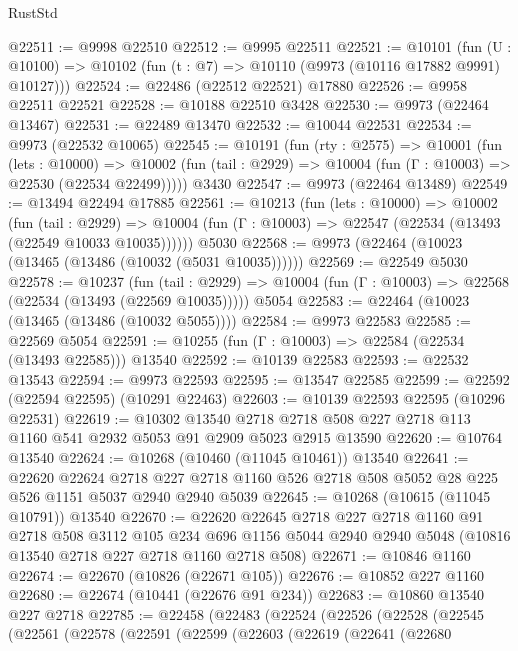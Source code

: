 \begin{lexlean}{RustStd}
\begin{coremodule}
@22511 := @9998 @22510
@22512 := @9995 @22511
@22521 := @10101
    (fun (U : @10100) => @10102 (fun (t : @7) => @10110 (@9973 (@10116 @17882 @9991) @10127)))
@22524 := @22486 (@22512 @22521) @17880
@22526 := @9958 @22511 @22521
@22528 := @10188 @22510 @3428
@22530 := @9973 (@22464 @13467)
@22531 := @22489 @13470
@22532 := @10044 @22531
@22534 := @9973 (@22532 @10065)
@22545 := @10191
    (fun (rty : @2575) =>
    @10001
      (fun (lets : @10000) =>
      @10002 (fun (tail : @2929) => @10004 (fun (Γ : @10003) => @22530 (@22534 @22499)))))
    @3430
@22547 := @9973 (@22464 @13489)
@22549 := @13494 @22494 @17885
@22561 := @10213
    (fun (lets : @10000) =>
    @10002
      (fun (tail : @2929) =>
      @10004 (fun (Γ : @10003) => @22547 (@22534 (@13493 (@22549 @10033 @10035))))))
    @5030
@22568 := @9973 (@22464 (@10023 (@13465 (@13486 (@10032 (@5031 @10035))))))
@22569 := @22549 @5030
@22578 := @10237
    (fun (tail : @2929) => @10004 (fun (Γ : @10003) => @22568 (@22534 (@13493 (@22569 @10035)))))
    @5054
@22583 := @22464 (@10023 (@13465 (@13486 (@10032 @5055))))
@22584 := @9973 @22583
@22585 := @22569 @5054
@22591 := @10255 (fun (Γ : @10003) => @22584 (@22534 (@13493 @22585))) @13540
@22592 := @10139 @22583
@22593 := @22532 @13543
@22594 := @9973 @22593
@22595 := @13547 @22585
@22599 := @22592 (@22594 @22595) (@10291 @22463)
@22603 := @10139 @22593 @22595 (@10296 @22531)
@22619 := @10302
    @13540
    @2718
    @2718
    @508
    @227
    @2718
    @113
    @1160
    @541
    @2932
    @5053
    @91
    @2909
    @5023
    @2915
    @13590
@22620 := @10764 @13540
@22624 := @10268 (@10460 (@11045 @10461)) @13540
@22641 := @22620
    @22624
    @2718
    @227
    @2718
    @1160
    @526
    @2718
    @508
    @5052
    @28
    @225
    @526
    @1151
    @5037
    @2940
    @2940
    @5039
@22645 := @10268 (@10615 (@11045 @10791)) @13540
@22670 := @22620
    @22645
    @2718
    @227
    @2718
    @1160
    @91
    @2718
    @508
    @3112
    @105
    @234
    @696
    @1156
    @5044
    @2940
    @2940
    @5048
    (@10816 @13540 @2718 @227 @2718 @1160 @2718 @508)
@22671 := @10846 @1160
@22674 := @22670 (@10826 (@22671 @105))
@22676 := @10852 @227 @1160
@22680 := @22674 (@10441 (@22676 @91 @234))
@22683 := @10860 @13540 @227 @2718
@22785 := @22458
    (@22483
      (@22524
        (@22526
          (@22528
            (@22545
              (@22561
                (@22578
                  (@22591
                    (@22599
                      (@22603
                        (@22619
                          (@22641
                            (@22680

\end{coremodule}
\end{lexlean}
